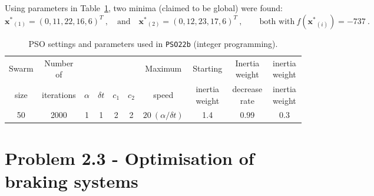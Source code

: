 \documentclass[12pt,titlepage]{article}
\begin{document}
Using parameters in Table~\ref{tab:2b}, two minima (claimed to be global) were found:
\[
\bm{x^{*}}_{(1)} = (0, 11, 22, 16, 6)^T \ , \quad \mbox{and} \quad \bm{x^{*}}_{(2)} = (0, 12, 23, 17, 6)^T \ , \qquad \mbox{both with} \ f(\bm{x^*}_{(i)}) = -737 \ .
\]

\begin{table}[hbtp]
\centering
\begin{tabular}{cccccccccc}
\toprule
Swarm & Number of &  &  &  &  & Maximum & Starting & Inertia weight & inertia weight \\
size & iterations & $ \alpha$ & $ \delta t$ & $ c_1$ & $ c_2$ & speed & inertia weight & decrease rate & inertia weight \\
\midrule
50 & 2000 & 1 & 1 & 2 & 2 & $ 20 \ (\alpha / \delta t) $ & 1.4 & 0.99 & 0.3 \\
\bottomrule
\end{tabular}
\caption{PSO settings and parameters used in \texttt{PSO22b} (integer programming).}
\label{tab:2b}
\end{table}

\section*{Problem 2.3 - Optimisation of braking systems}
\end{document}
